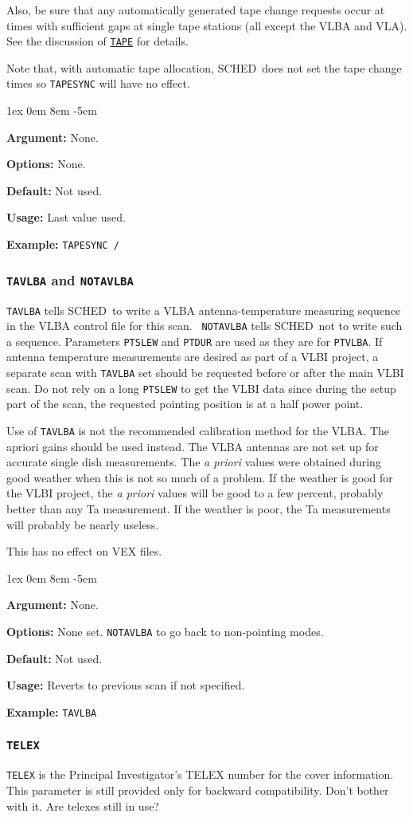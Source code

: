 \documentclass{report}
\newcommand{\schedb}{{\sc SCHED~}}
\newcommand{\rcwbox}[5]{
  \begin{list}{}{\parsep 1ex  \itemsep 0em
                 \leftmargin 8em  \itemindent -5em }
    \item {\bf Argument:} #1
    \item {\bf Options:}  #2
    \item {\bf Default:}  #3
    \item {\bf Usage:}    #4
    \item {\bf Example:}  #5
  \end{list}
}
\begin{document}
Also, be sure that any automatically generated tape change requests
occur at times with sufficient gaps at single tape stations (all
except the VLBA and VLA).  See the discussion of 
{\hyperref[MP:TAPE]{{\tt TAPE}}} for details.

Note that, with automatic tape allocation, \schedb does not set the
tape change times so {\tt TAPESYNC} will have no effect.

\rcwbox
{None.}
{None.}
{Not used.}
{Last value used.}
{{\tt TAPESYNC /}}

\subsubsection{\label{MP:TAVLBA}{\tt TAVLBA} and {\tt NOTAVLBA}}

{\tt TAVLBA} tells \schedb to write a VLBA antenna-temperature
measuring sequence in the VLBA control file for this scan.  {\tt
NOTAVLBA} tells \schedb not to write such a sequence.  Parameters
{\tt PTSLEW} and {\tt PTDUR} are used as they are for {\tt PTVLBA}.
If antenna temperature measurements are desired as part of a VLBI
project, a separate scan with {\tt TAVLBA} set should be requested
before or after the main VLBI scan. Do not rely on a long {\tt PTSLEW}
to get the VLBI data since during the setup part of the scan, the
requested pointing position is at a half power point.

Use of {\tt TAVLBA} is not the recommended calibration method for the
VLBA. The apriori gains should be used instead. The VLBA antennas are
not set up for accurate single dish measurements. The {\em a priori}
values were obtained during good weather when this is not so much of a
problem. If the weather is good for the VLBI project, the {\em a
priori} values will be good to a few percent, probably better than any
Ta measurement. If the weather is poor, the Ta measurements will
probably be nearly useless.

This has no effect on VEX files.

\rcwbox
{None.}
{None set. {\tt NOTAVLBA} to go back to non-pointing modes.}
{Not used.}
{Reverts to previous scan if not specified.}
{{\tt TAVLBA}}


\subsubsection{\label{MP:TELEX}{\tt TELEX}}

{\tt TELEX} is the Principal Investigator's TELEX number for the
cover information.  This parameter is still provided only for
backward compatibility.  Don't bother with it.  Are telexes still
in use?
\end{document}
